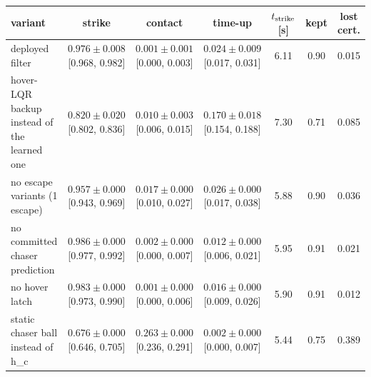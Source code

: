 \begin{tabular}{lcccccc}\toprule
variant & strike & contact & time-up & $t_{\rm strike}$ [s] & kept & lost cert.\\\midrule
deployed filter & $0.976\pm0.008$ {\scriptsize [0.968, 0.982]} & $0.001\pm0.001$ {\scriptsize [0.000, 0.003]} & $0.024\pm0.009$ {\scriptsize [0.017, 0.031]} & 6.11 & 0.90 & 0.015\\
hover-LQR backup instead of the learned one & $0.820\pm0.020$ {\scriptsize [0.802, 0.836]} & $0.010\pm0.003$ {\scriptsize [0.006, 0.015]} & $0.170\pm0.018$ {\scriptsize [0.154, 0.188]} & 7.30 & 0.71 & 0.085\\
no escape variants (1 escape) & $0.957\pm0.000$ {\scriptsize [0.943, 0.969]} & $0.017\pm0.000$ {\scriptsize [0.010, 0.027]} & $0.026\pm0.000$ {\scriptsize [0.017, 0.038]} & 5.88 & 0.90 & 0.036\\
no committed chaser prediction & $0.986\pm0.000$ {\scriptsize [0.977, 0.992]} & $0.002\pm0.000$ {\scriptsize [0.000, 0.007]} & $0.012\pm0.000$ {\scriptsize [0.006, 0.021]} & 5.95 & 0.91 & 0.021\\
no hover latch & $0.983\pm0.000$ {\scriptsize [0.973, 0.990]} & $0.001\pm0.000$ {\scriptsize [0.000, 0.006]} & $0.016\pm0.000$ {\scriptsize [0.009, 0.026]} & 5.90 & 0.91 & 0.012\\
static chaser ball instead of h_c & $0.676\pm0.000$ {\scriptsize [0.646, 0.705]} & $0.263\pm0.000$ {\scriptsize [0.236, 0.291]} & $0.002\pm0.000$ {\scriptsize [0.000, 0.007]} & 5.44 & 0.75 & 0.389\\
\bottomrule\end{tabular}
